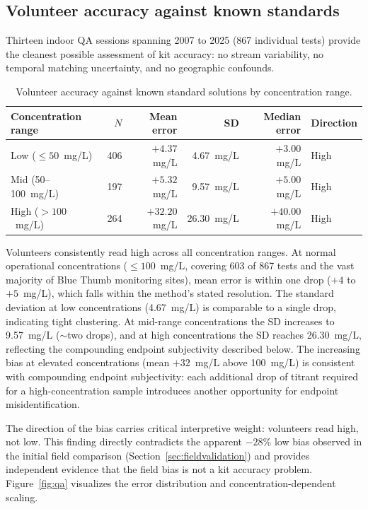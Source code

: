 \documentclass[lineno]{wlpeerj}
\begin{document}
\subsection{Volunteer accuracy against known standards}

Thirteen indoor QA sessions spanning 2007 to 2025 (867 individual tests) provide the cleanest possible assessment of kit accuracy: no stream variability, no temporal matching uncertainty, and no geographic confounds.

\begin{table}[ht]
\centering
\caption{Volunteer accuracy against known standard solutions by concentration range.}
\label{tab:accuracy}
\begin{tabular}{l r r r r l}
\toprule
Concentration range & $N$ & Mean error & SD & Median error & Direction \\
\midrule
Low ($\leq 50$~mg/L) & 406 & $+4.37$~mg/L & 4.67~mg/L & $+3.00$~mg/L & High \\
Mid (50--100~mg/L) & 197 & $+5.32$~mg/L & 9.57~mg/L & $+5.00$~mg/L & High \\
High ($> 100$~mg/L) & 264 & $+32.20$~mg/L & 26.30~mg/L & $+40.00$~mg/L & High \\
\bottomrule
\end{tabular}
\end{table}

Volunteers consistently read high across all concentration ranges. At normal operational concentrations ($\leq 100$~mg/L, covering 603 of 867 tests and the vast majority of Blue Thumb monitoring sites), mean error is within one drop ($+4$ to $+5$~mg/L), which falls within the method's stated resolution. The standard deviation at low concentrations (4.67~mg/L) is comparable to a single drop, indicating tight clustering. At mid-range concentrations the SD increases to 9.57~mg/L ($\sim$two drops), and at high concentrations the SD reaches 26.30~mg/L, reflecting the compounding endpoint subjectivity described below. The increasing bias at elevated concentrations (mean $+32$~mg/L above 100~mg/L) is consistent with compounding endpoint subjectivity: each additional drop of titrant required for a high-concentration sample introduces another opportunity for endpoint misidentification.

The direction of the bias carries critical interpretive weight: volunteers read high, not low. This finding directly contradicts the apparent $-28\%$ low bias observed in the initial field comparison (Section~\ref{sec:fieldvalidation}) and provides independent evidence that the field bias is not a kit accuracy problem. Figure~\ref{fig:qa} visualizes the error distribution and concentration-dependent scaling.
\end{document}
